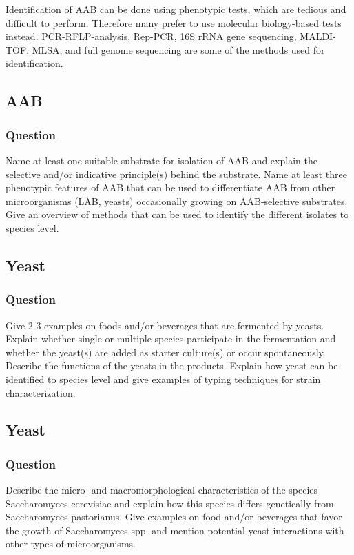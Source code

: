 Identification of AAB can be done using phenotypic tests, which are tedious and difficult to perform. Therefore many prefer to use molecular biology-based tests instead. PCR-RFLP-analysis, Rep-PCR, 16S rRNA gene sequencing, MALDI-TOF, MLSA, and full genome sequencing are some of the methods used for identification.


\subsection{AAB}
\subsubsection*{Question}
Name at least one suitable substrate for isolation of AAB and explain the selective and/or indicative principle(s) behind the substrate. Name at least three phenotypic features of AAB that can be used to differentiate AAB from other microorganisms (LAB, yeasts) occasionally growing on AAB-selective substrates. Give an overview of methods that can be used to identify the different isolates to species level. 

\subsection{Yeast}
\subsubsection*{Question}
Give 2-3 examples on foods and/or beverages that are fermented by yeasts. Explain whether single or multiple species participate in the fermentation and whether the yeast(s) are added as starter culture(s) or occur spontaneously. Describe the functions of the yeasts in the products. Explain how yeast can be identified to species level and give examples of typing techniques for strain characterization. 

\subsection{Yeast}
\subsubsection*{Question}
Describe the micro- and macromorphological characteristics of the species Saccharomyces cerevisiae and explain how this species differs genetically from Saccharomyces pastorianus. Give examples on food and/or beverages that favor the growth of Saccharomyces spp. and mention potential yeast interactions with other types of microorganisms. 

